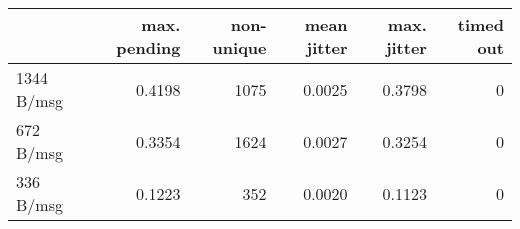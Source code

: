\begin{tabular}{l|rrrrr}
\rowcolor{gray!50}
 & max. pending & non-unique & mean jitter & max. jitter & timed out\\\hline
1344 B/msg & 0.4198 & 1075 & 0.0025 & 0.3798 & 0 \\
672 B/msg & 0.3354 & 1624 & 0.0027 & 0.3254 & 0 \\
336 B/msg & 0.1223 & 352 & 0.0020 & 0.1123 & 0 \\
\end{tabular}
